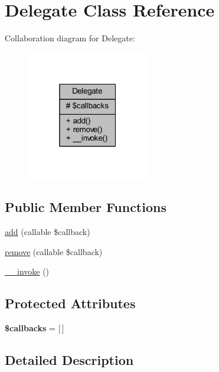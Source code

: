 \hypertarget{class_delegate}{}\section{Delegate Class Reference}
\label{class_delegate}


Collaboration diagram for Delegate\+:
\nopagebreak
\begin{figure}[H]
\begin{center}
\leavevmode
\includegraphics[width=151pt]{class_delegate__coll__graph}
\end{center}
\end{figure}
\subsection*{Public Member Functions}
\begin{DoxyCompactItemize}
\item 
\hyperlink{class_delegate_a2db8611725175f0ef569cb2ee7d1ef24}{add} (callable \$callback)
\item 
\hyperlink{class_delegate_aba650b6c889c96ddacd660d1e4e1a1d7}{remove} (callable \$callback)
\item 
\hyperlink{class_delegate_a9aac7e1475efe923de4e19cc2511f092}{\+\_\+\+\_\+invoke} ()
\end{DoxyCompactItemize}
\subsection*{Protected Attributes}
\begin{DoxyCompactItemize}
\item 
\mbox{\label{class_delegate_a151f6e603ac02a25364ad54bee36ab2a}} 
{\bfseries \$callbacks} = \mbox{[}$\,$\mbox{]}
\end{DoxyCompactItemize}


\subsection{Detailed Description}



